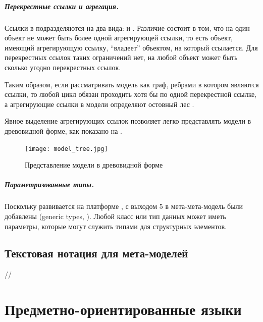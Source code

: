 \paragraph*{Перекрестные ссылки и агрегация.} Ссылки в  подразделяются на два вида:  и . Различие состоит в том, что на один объект не может быть более одной агрегирующей ссылки, то есть объект, имеющий агрегирующую ссылку, ``владеет'' объектом, на который ссылается. Для перекрестных ссылок таких ограничений нет, на любой объект может быть сколько угодно перекрестных ссылок.

Таким образом, если рассматривать модель как граф, ребрами в котором являются ссылки, то любой цикл обязан проходить хотя бы по одной перекрестной ссылке, а агрегирующие ссылки в модели определяют остовный лес \cite{cormen01introduction}.

Явное выделение агрегирующих ссылок позволяет легко представлять модели в древовидной форме, как показано на .

\begin{figure}[htbp]
\centering
\texttt{[image: model\_tree.jpg]}
\caption{Представление модели в древовидной форме}\label{ModelTree}
\end{figure}

\paragraph*{Параметризованные типы.} Поскольку  развивается на платформе , с выходом  5 в мета-мета-модель были добавлены  (generic types, \cite{GJ}). Любой класс или тип данных может иметь параметры, которые могут служить типами для структурных элементов.

\section{Текстовая нотация для мета-моделей}
//

\chapter{Предметно-ориентированные языки}

